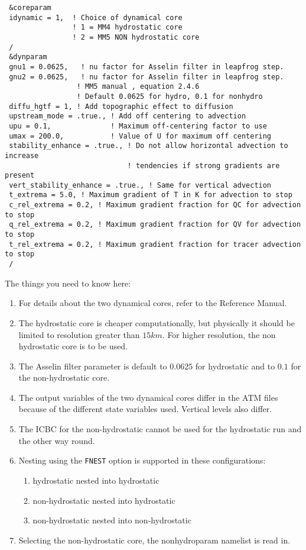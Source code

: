 {\footnotesize
\begin{Verbatim}
 &coreparam
 idynamic = 1,  ! Choice of dynamical core
                ! 1 = MM4 hydrostatic core
                ! 2 = MM5 NON hydrostatic core
 /
 &dynparam
 gnu1 = 0.0625,   ! nu factor for Asselin filter in leapfrog step.
 gnu2 = 0.0625,   ! nu factor for Asselin filter in leapfrog step.
                 ! MM5 manual , equation 2.4.6
                 ! Default 0.0625 for hydro, 0.1 for nonhydro
 diffu_hgtf = 1, ! Add topographic effect to diffusion
 upstream_mode = .true., ! Add off centering to advection
 upu = 0.1,              ! Maximum off-centering factor to use
 umax = 200.0,           ! Value of U for maximum off centering
 stability_enhance = .true., ! Do not allow horizontal advection to increase
                             ! tendencies if strong gradients are present
 vert_stability_enhance = .true., ! Same for vertical advection
 t_extrema = 5.0, ! Maximum gradient of T in K for advection to stop
 c_rel_extrema = 0.2, ! Maximum gradient fraction for QC for advection to stop
 q_rel_extrema = 0.2, ! Maximum gradient fraction for QV for advection to stop
 t_rel_extrema = 0.2, ! Maximum gradient fraction for tracer advection to stop
 /
\end{Verbatim}
}

The things you need to know here:

\begin{enumerate}
\item For details about the two dynamical cores, refer to the Reference Manual.
\item The hydrostatic core is cheaper computationally, but physically it should
be limited to resolution greater than $15 km$. For higher resolution, the non
hydrostatic core is to be used.
\item The Asselin filter parameter is default to $0.0625$ for hydrostatic and
to $0.1$ for the non-hydrostatic core.
\item The output variables of the two dynamical cores differ in the ATM files
because of the different state variables used. Vertical levels also differ.
\item The ICBC for the non-hydrostatic cannot be used for the hydrostatic run
and the other way round.
\item Nesting using the \verb=FNEST= option is supported in these
configurations:
\begin{enumerate}
\item hydrostatic nested into hydrostatic
\item non-hydrostatic nested into hydrostatic
\item non-hydrostatic nested into non-hydrostatic
\end{enumerate}
\item Selecting the non-hydrostatic core, the nonhydroparam namelist is read
in.
\end{enumerate}


